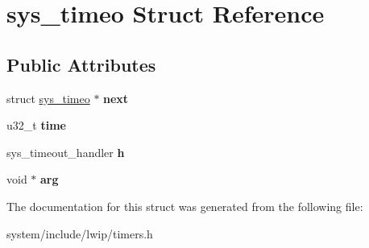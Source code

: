 \hypertarget{structsys__timeo}{}\section{sys\+\_\+timeo Struct Reference}
\label{structsys__timeo}
\subsection*{Public Attributes}
\begin{DoxyCompactItemize}
\item 
\hypertarget{structsys__timeo_addfc1875758f06d6036f5dda30beed9e}{}struct \hyperlink{structsys__timeo}{sys\+\_\+timeo} $\ast$ {\bfseries next}\label{structsys__timeo_addfc1875758f06d6036f5dda30beed9e}

\item 
\hypertarget{structsys__timeo_a7641719a0ce0daec85e86f188f03bca1}{}u32\+\_\+t {\bfseries time}\label{structsys__timeo_a7641719a0ce0daec85e86f188f03bca1}

\item 
\hypertarget{structsys__timeo_a483e9c13d60e0adf6731869daa3e8b4d}{}sys\+\_\+timeout\+\_\+handler {\bfseries h}\label{structsys__timeo_a483e9c13d60e0adf6731869daa3e8b4d}

\item 
\hypertarget{structsys__timeo_a74e07a9d80232319984ee3112e91eef3}{}void $\ast$ {\bfseries arg}\label{structsys__timeo_a74e07a9d80232319984ee3112e91eef3}

\end{DoxyCompactItemize}


The documentation for this struct was generated from the following file\+:\begin{DoxyCompactItemize}
\item 
system/include/lwip/timers.\+h\end{DoxyCompactItemize}

